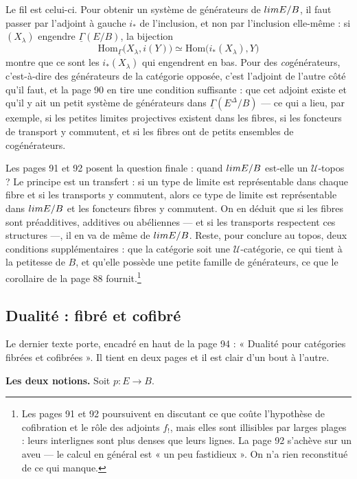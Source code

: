 \documentclass[11pt,a4paper]{article}
\begin{document}
Le fil est celui-ci. Pour obtenir un système de générateurs de
$\varprojlim E/B$, il faut passer par l'adjoint à gauche $i_{*}$ de
l'inclusion, et non par l'inclusion elle-même : si $(X_{\lambda})$ engendre
$\underline{\Gamma}(E/B)$, la bijection
\[
  \mathrm{Hom}_{\underline{\Gamma}}\bigl( X_{\lambda}, i(Y) \bigr)
  \simeq \mathrm{Hom}\bigl( i_{*}(X_{\lambda}), Y \bigr)
\]
montre que ce sont les $i_{*}(X_{\lambda})$ qui engendrent en bas. Pour des
\emph{co}générateurs, c'est-à-dire des générateurs de la catégorie opposée,
c'est l'adjoint de l'autre côté qu'il faut, et la page 90 en tire une condition
suffisante : que cet adjoint existe et qu'il y ait un petit système de
générateurs dans $\underline{\Gamma}(E^{\Delta}/B)$ — ce qui a lieu, par
exemple, si les petites limites projectives existent dans les fibres, si les
foncteurs de transport y commutent, et si les fibres ont de petits ensembles de
cogénérateurs.


Les pages 91 et 92 posent la question finale : quand $\varprojlim E/B$ est-elle
un $\mathcal{U}$-topos ? Le principe est un transfert : si un type de limite
est représentable dans chaque fibre et si les transports y commutent, alors ce
type de limite est représentable dans $\varprojlim E/B$ et les foncteurs fibres
y commutent. On en déduit que si les fibres sont préadditives, additives ou
abéliennes — et si les transports respectent ces structures —, il en va de même
de $\varprojlim E/B$. Reste, pour conclure au topos, deux conditions
supplémentaires : que la catégorie soit une $\mathcal{U}$-catégorie, ce qui
tient à la petitesse de $B$, et qu'elle possède une petite famille de
générateurs, ce que le corollaire de la page 88 fournit.\footnote{Les pages 91
et 92 poursuivent en discutant ce que coûte l'hypothèse de cofibration et le
rôle des adjoints $f_{!}$, mais elles sont illisibles par larges plages : leurs
interlignes sont plus denses que leurs lignes. La page 92 s'achève sur un aveu
— le calcul en général est « un peu fastidieux ». On n'a rien reconstitué de ce
qui manque.}

\subsection*{Dualité : fibré et cofibré}

Le dernier texte porte, encadré en haut de la page 94 : « Dualité pour
catégories fibrées et cofibrées ». Il tient en deux pages et il est clair d'un
bout à l'autre.


\textbf{Les deux notions.} Soit $p : E \to B$.
\end{document}
